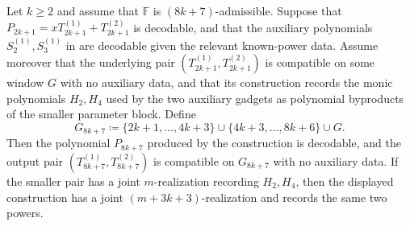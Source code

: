 \begin{lemma}\label{lem:8k+7-splittable}
    Let $k\ge2$ and assume that $\mathbb{F}$ is $(8k+7)$-admissible.
    Suppose that $P_{2k+1}=xT^{(1)}_{2k+1}+T^{(2)}_{2k+1}$ is decodable, and that the auxiliary polynomials $S^{(1)}_2,S^{(1)}_3$ in  are decodable given the relevant known-power data.
    Assume moreover that the underlying pair
    $(T^{(1)}_{2k+1},T^{(2)}_{2k+1})$ is compatible on some window $G$
    with no auxiliary data, and that its construction records the monic
    polynomials $H_2,H_4$ used by the two auxiliary gadgets as polynomial
    byproducts of the smaller parameter block.
    Define
    \[
      G_{8k+7}\coloneqq \{2k+1,\ldots,4k+3\}\cup\{4k+3,\ldots,8k+6\}\cup G.
    \]
    Then the polynomial $P_{8k+7}$ produced by the construction is decodable,
    and the output pair $(T^{(1)}_{8k+7},T^{(2)}_{8k+7})$ is compatible on
    $G_{8k+7}$ with no auxiliary data.  If the smaller pair has a joint
    $m$-realization recording $H_2,H_4$, then the displayed construction has
    a joint $(m+3k+3)$-realization and records the same two powers.
\end{lemma}
